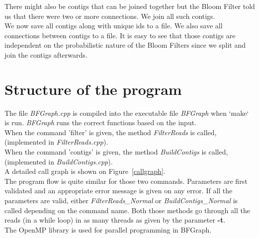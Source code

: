 \documentclass[a4paper]{report}
\renewcommand{\b}[1]{\textbf{#1}}  %
\renewcommand{\i}[1]{\textit{#1}}  %
\newcommand{\e}[1]{\emph{#1}}    %
\begin{document}
There might also be contigs that can be joined together but the Bloom Filter told us that there were two or more connections. We join all
such contigs.\\[4pt]

We now save all contigs along with unique ids to a file. We also save all connections between contigs to a file. It is easy to see
that those contigs are independent on the probabilistic nature of the Bloom Filters since we split and join the contigs afterwards.\\[4pt]


\chapter{Structure of the program}
The file \e{BFGraph.cpp} is compiled into the executable file \e{BFGraph} when `make` is run. 
\e{BFGraph} runs the correct functions based on the input.\\[4pt]
When the command 'filter' is given, the method \i{FilterReads} is called, (implemented in \e{FilterReads.cpp}).\\
When the command 'contigs' is given, the method \i{BuildContigs} is called, (implemented in \e{BuildContigs.cpp}).\\
A detailed call graph is shown on Figure~\ref{callgraph}.\\[4pt]

The program flow is quite similar for those two commands. Parameters are first validated and an appropriate error message is given
on any error. If all the parameters are valid, either \i{FilterReads\_Normal} or \i{BuildContigs\_Normal} is called depending
on the command name. Both those methods go through all the reads (in a while loop) in as many threads as given by the parameter \b{-t}.\\[4pt]

The OpenMP\cite{openmp} library is used for parallel programming in BFGraph.\\[4pt]
\end{document}
